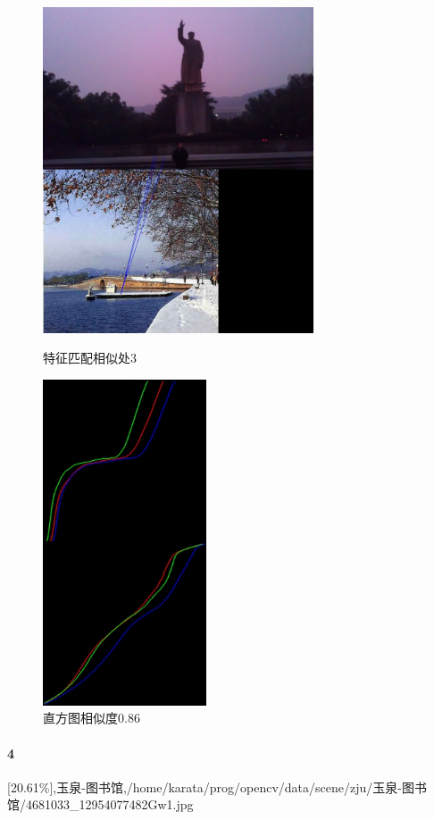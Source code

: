 \begin{figure}[htb]
\begin{minipage}[t]{0.5\linewidth}
\centering
\includegraphics[height=3.8in]{玉泉毛像.jpg.d/im3sift.jpg}
\caption{特征匹配相似处3}
\label{fig:side:a}
\end{minipage}%
\begin{minipage}[t]{0.5\linewidth}
\centering
\includegraphics[height=3.8in]{玉泉毛像.jpg.d/im3hist2.jpg}
\caption{直方图相似度0.86}
\label{fig:side:a}
\end{minipage}%
\end{figure}

\clearpage
\paragraph{4}
[20.61\%],玉泉-图书馆,/home/karata/prog/opencv/data/scene/zju/玉泉-图书馆/4681033\_12954077482Gw1.jpg

